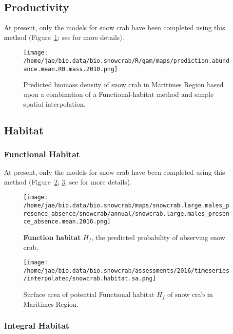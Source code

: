 \documentclass[letterpaper,portrait,11pt]{scrartcl}
\numberwithin{equation}{section}    %
\numberwithin{figure}{section}    %
\numberwithin{table}{section}       %
\begin{document}
\subsection{Productivity}
At present, only the models for snow crab have been completed using this method (Figure~\ref{fig:snowcrabAbundance}; see \cite{choi:2012:resdoc} for more details).



\begin{figure}
  \label{fig:snowcrabAbundance}
  \centering
  \texttt{[image: /home/jae/bio.data/bio.snowcrab/R/gam/maps/prediction.abundance.mean.R0.mass.2010.png]}
  \caption{Predicted biomass density of snow crab in Maritimes Region based upon a combination of a Functional-habitat method and simple spatial interpolation.}
\end{figure}

\subsection{Habitat}

\subsubsection{Functional Habitat}

At present, only the models for snow crab have been completed using this method (Figure~\ref{fig:snowcrabHabitat}; \ref{fig:snowcrabHabitatTS}; see \cite{choi:2012:resdoc} for more details).

\begin{figure}[h]
  \label{fig:snowcrabHabitat}
  \centering
  \texttt{[image: /home/jae/bio.data/bio.snowcrab/maps/snowcrab.large.males\_presence\_absence/snowcrab/annual/snowcrab.large.males\_presence\_absence.mean.2016.png]}
  \caption{\textbf{Function habitat} $H_f$, the predicted probability of observing snow crab.}
\end{figure}

\begin{figure}[h]
  \label{fig:snowcrabHabitatTS}
  \centering
  \texttt{[image: /home/jae/bio.data/bio.snowcrab/assessments/2016/timeseries/interpolated/snowcrab.habitat.sa.png]}
  \caption{Surface area of potential Functional habitat $H_f$ of snow crab in Maritimes Region.}
\end{figure}


\afterpage{\clearpage}
\subsubsection{Integral Habitat}
\end{document}

